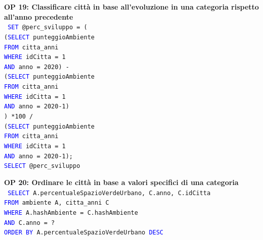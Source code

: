 \documentclass[a4paper,12pt]{report}
\begin{document}
            \noindent
            \textbf{OP 19: Classificare città in base all'evoluzione in una categoria rispetto all'anno precedente} \\
            \texttt{
                \textcolor{blue}{SET} @perc\_sviluppo = ( \\
                \null\qquad(\textcolor{blue}{SELECT} punteggioAmbiente \\ 
                \null\qquad  \textcolor{blue}{FROM} citta\_anni \\
                \null\qquad  \textcolor{blue}{WHERE} idCitta = 1 \\
                \null\qquad  \textcolor{blue}{AND} anno = 2020) - \\
                \null\qquad(\textcolor{blue}{SELECT} punteggioAmbiente \\
                \null\qquad  \textcolor{blue}{FROM} citta\_anni \\
                \null\qquad  \textcolor{blue}{WHERE} idCitta = 1 \\
                \null\qquad  \textcolor{blue}{AND} anno = 2020-1)\\
                \null\qquad) *100 /  \\
                \null\qquad(\textcolor{blue}{SELECT} punteggioAmbiente \\
                \null\qquad \textcolor{blue}{FROM} citta\_anni \\
                \null\qquad \textcolor{blue}{WHERE} idCitta = 1 \\
                \null\qquad \textcolor{blue}{AND} anno = 2020-1); \\
                \textcolor{blue}{SELECT} @perc\_sviluppo
            }
            
            \noindent
            \textbf{OP 20: Ordinare le città in base a valori specifici di una categoria} \\
            \texttt{
                \textcolor{blue}{SELECT} A.percentualeSpazioVerdeUrbano, C.anno, C.idCitta \\
                \textcolor{blue}{FROM} ambiente A, citta\_anni C \\
                \textcolor{blue}{WHERE} A.hashAmbiente = C.hashAmbiente  \\
                \textcolor{blue}{AND} C.anno = ? \\
                \textcolor{blue}{ORDER BY} A.percentualeSpazioVerdeUrbano \textcolor{blue}{DESC} \\
            }
            
\end{document}
